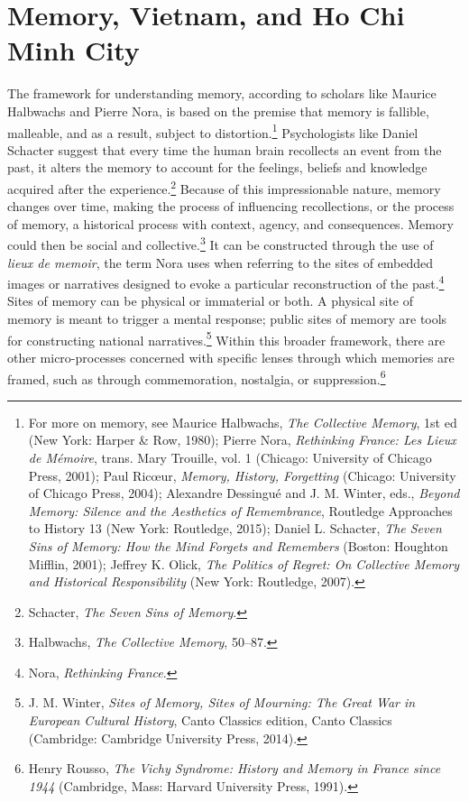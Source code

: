 \section{Memory, Vietnam, and Ho Chi Minh City}
The framework for understanding memory, according to scholars like Maurice Halbwachs and Pierre Nora, is based on the premise that memory is fallible, malleable, and as a result, subject to distortion.\footnote{For more on memory, see Maurice Halbwachs, \textit{The Collective Memory}, 1st ed (New York: Harper \& Row, 1980); Pierre Nora, \textit{Rethinking France: Les Lieux de Mémoire}, trans. Mary Trouille, vol. 1 (Chicago: University of Chicago Press, 2001); Paul Ricœur, \textit{Memory, History, Forgetting} (Chicago: University of Chicago Press, 2004); Alexandre Dessingué and J. M. Winter, eds., \textit{Beyond Memory: Silence and the Aesthetics of Remembrance}, Routledge Approaches to History 13 (New York: Routledge, 2015); Daniel L. Schacter, \textit{The Seven Sins of Memory: How the Mind Forgets and Remembers} (Boston: Houghton Mifflin, 2001); Jeffrey K. Olick, \textit{The Politics of Regret: On Collective Memory and Historical Responsibility} (New York: Routledge, 2007).} Psychologists like Daniel Schacter suggest that every time the human brain recollects an event from the past, it alters the memory to account for the feelings, beliefs and knowledge acquired after the experience.\footnote{Schacter, \textit{The Seven Sins of Memory}.} Because of this impressionable nature, memory changes over time, making the process of influencing recollections, or the process of memory, a historical process with context, agency, and consequences. Memory could then be social and collective.\footnote{Halbwachs, \textit{The Collective Memory}, 50–87.} It can be constructed through the use of \textit{lieux de memoir}, the term Nora uses when referring to the sites of embedded images or narratives designed to evoke a particular reconstruction of the past.\footnote{Nora, \textit{Rethinking France}.} Sites of memory can be physical or immaterial or both. A physical site of memory is meant to trigger a mental response; public sites of memory are tools for constructing national narratives.\footnote{J. M. Winter, \textit{Sites of Memory, Sites of Mourning: The Great War in European Cultural History}, Canto Classics edition, Canto Classics (Cambridge: Cambridge University Press, 2014).} Within this broader framework, there are other micro-processes concerned with specific lenses through which memories are framed, such as through commemoration, nostalgia, or suppression.\footnote{Henry Rousso, \textit{The Vichy Syndrome: History and Memory in France since 1944} (Cambridge, Mass: Harvard University Press, 1991).} 

